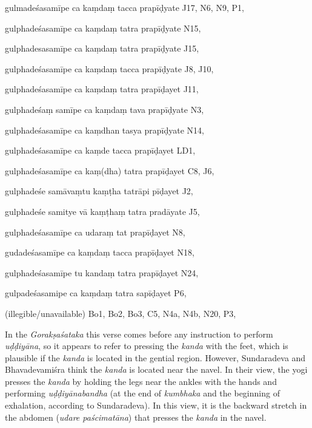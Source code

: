 \begin{marma}[hp03_064cd]
\item[gulmadeśasamīpe ca kaṃdaṃ tacca prapīḍyate] J17, N6, N9, P1, 
\item[gulphadeśasamīpe ca kaṃdaṃ tatra prapīḍyate] N15,
\item[gulphadesasamīpe ca kaṃdaṃ tatra prapīḍyate] J15,
\item[gulphadeśasamīpe ca kaṃdaṃ tacca prapīḍyate] J8, J10, 
\item[gulphadeśasamīpe ca kaṃdaṃ tatra prapīḍayet] J11,
\item[gulphadeśaṃ samīpe ca kaṃdaṃ tava prapīḍyate] N3,
\item[gulphadeśasamīpe ca kaṃdhan tasya prapīḍyate] N14,
\item[gulphadeśasamīpe ca kaṃde tacca prapīḍayet] LD1,
\item[gulphadeśasamīpe ca kaṃ(dha) tatra prapīḍayet] C8, J6, 
\item[gulphadeśe samāvaṃtu kaṃṭha tatrāpi pīḍayet] J2,
\item[gulphadeśe samitye vā kaṃṭhaṃ tatra pradāyate] J5,
\item[gulphadeśasamīpe ca udaraṃ tat prapīḍayet] N8,
\item[gudadeśasamīpe ca kaṃdaṃ tacca prapīḍayet] N18,
\item[gulphadeśasamīpe tu kandaṃ tatra prapīḍayet] N24,
\item[gulpadeśasamipe ca kaṃdaṃ tatra sapīḍayet] P6,
\item[(illegible/unavailable)] Bo1, Bo2, Bo3, C5, N4a, N4b, N20, P3,

  \begin{description}
In the \emph{Gorakṣaśataka} this verse comes before any instruction to perform \emph{uḍḍiyāna}, so it appears to refer to pressing the \emph{kanda} with the feet, which is plausible if the \emph{kanda} is located in the gential region. However, Sundaradeva and Bhavadevamiśra think the \emph{kanda} is located near the navel. In their view, the yogi presses the \emph{kanda} by holding the legs near the ankles with the hands and performing \emph{uḍḍiyānabandha} (at the end of \emph{kumbhaka} and the beginning of exhalation, according to Sundaradeva). In this view, it is the backward stretch in the abdomen (\emph{udare paścimatāna}) that presses the \emph{kanda} in the navel.
  \end{description}

\end{marma}

